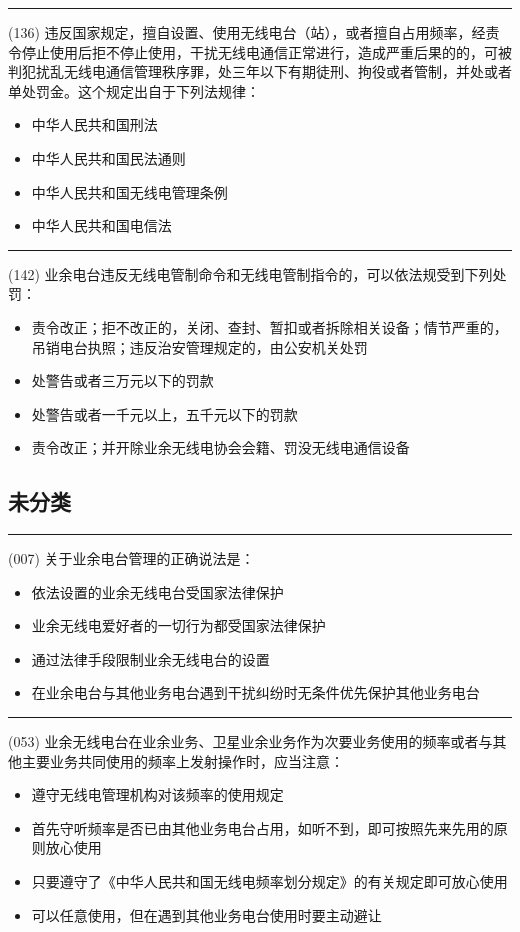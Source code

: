 \documentclass[twocolumn,hyperref,UTF8]{ctexart}  %
\begin{document}
\noindent\rule{0.5\textwidth}{1pt}
\heiti (136) 违反国家规定，擅自设置、使用无线电台（站），或者擅自占用频率，经责令停止使用后拒不停止使用，干扰无线电通信正常进行，造成严重后果的的，可被判犯扰乱无线电通信管理秩序罪，处三年以下有期徒刑、拘役或者管制，并处或者单处罚金。这个规定出自于下列法规律： \songti {\color{gray} [LK0103] }
\begin{itemize}
	\item  中华人民共和国刑法
	\item  中华人民共和国民法通则
	\item  中华人民共和国无线电管理条例
	\item  中华人民共和国电信法
\end{itemize}


\noindent\rule{0.5\textwidth}{1pt}
\heiti (142) 业余电台违反无线电管制命令和无线电管制指令的，可以依法规受到下列处罚： \songti {\color{gray} [LK0110] }
\begin{itemize}
	\item   责令改正；拒不改正的，关闭、查封、暂扣或者拆除相关设备；情节严重的，吊销电台执照；违反治安管理规定的，由公安机关处罚
	\item   处警告或者三万元以下的罚款
	\item   处警告或者一千元以上，五千元以下的罚款 
	\item   责令改正；并开除业余无线电协会会籍、罚没无线电通信设备
\end{itemize}



\clearpage
\subsection{未分类}


\noindent\rule{0.5\textwidth}{1pt}
\heiti (007) 关于业余电台管理的正确说法是： \songti {\color{gray} [LK0012] }
\begin{itemize}
	\item  依法设置的业余无线电台受国家法律保护
	\item  业余无线电爱好者的{\color{red}一切行为都}受国家法律保护
	\item  通过法律手段{\color{red}限制}业余无线电台的设置
	\item  在业余电台与其他业务电台遇到干扰纠纷时无条件{\color{red}优先保护其他}业务电台
\end{itemize}


\noindent\rule{0.5\textwidth}{1pt}
\heiti (053) 业余无线电台在业余业务、卫星业余业务作为次要业务使用的频率或者与其他主要业务共同使用的频率上发射操作时，应当注意： \songti {\color{gray} [LK0048] }
\begin{itemize}
	\item  遵守无线电管理机构对该频率的使用规定
	\item  首先守听频率是否已由其他业务电台占用，如听不到，即可按照先来先用的原则放心使用
	\item  只要遵守了《中华人民共和国无线电频率划分规定》的有关规定即可放心使用
	\item  可以任意使用，但在遇到其他业务电台使用时要主动避让
\end{itemize}
\end{document}
